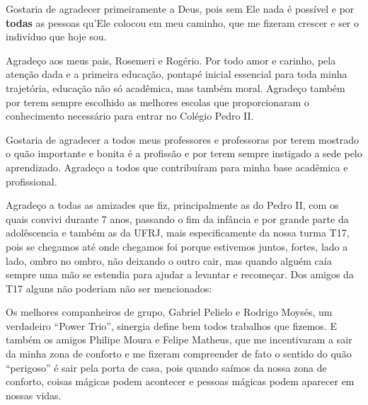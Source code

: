 Gostaria de agradecer primeiramente a Deus, pois sem Ele nada é
possível e por \textbf{todas} as pessoas qu'Ele colocou em meu
caminho, que me fizeram crescer e ser o indivíduo que hoje sou.

Agradeço aos meus pais, Rosemeri e Rogério. Por todo amor e carinho, pela
atenção dada e a primeira educação, pontapé inicial essencial para toda minha
trajetória, educação não só acadêmica, mas também moral. Agradeço também por
terem sempre escolhido as melhores escolas que proporcionaram o conhecimento
necessário para entrar no Colégio Pedro II. 

Gostaria de agradecer a todos meus professores e professoras por terem mostrado o quão importante e bonita é a
   profissão e por terem sempre instigado a sede pelo aprendizado.
   Agradeço a todos que contribuíram para minha base acadêmica e profissional.

Agradeço a todas as amizades que fiz, principalmente as do Pedro II, com os
   quais convivi durante 7 anos, passando o fim da infância e por grande parte
   da adolêscencia e também as da UFRJ, mais especificamente da nossa turma T17,
   pois se chegamos até onde chegamos foi porque estivemos juntos, fortes, lado a lado,
   ombro no ombro, não deixando o outro cair, mas quando alguém caía sempre uma
   mão se estendia para ajudar a levantar e recomeçar.
Dos amigos da T17 alguns não poderiam não ser mencionados:

Os melhores companheiros de grupo, Gabriel Pelielo e Rodrigo Moysés, um
verdadeiro ``Power Trio'', sinergia define bem todos trabalhos que fizemos. E também os amigos Philipe Moura e
Felipe Matheus, que me incentivaram a sair da minha zona de conforto e me
fizeram compreender de fato o sentido do quão ``perigoso'' é sair pela porta de casa, pois
quando saímos da nossa zona de conforto, coisas mágicas podem acontecer e
pessoas mágicas podem aparecer em nossas vidas.


